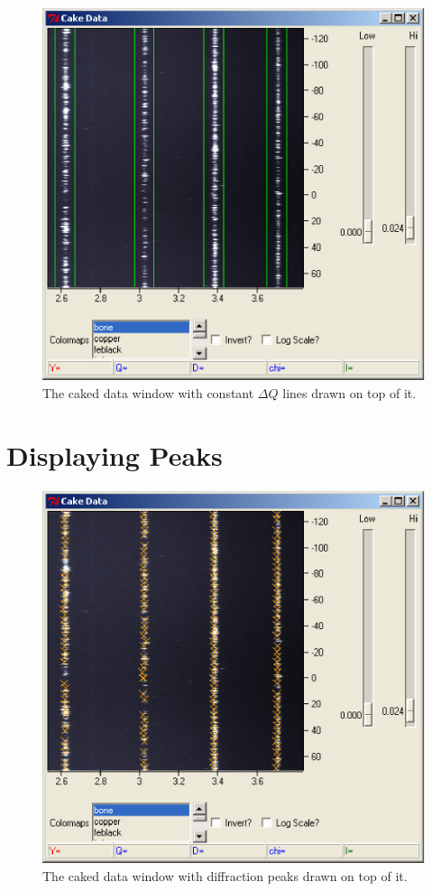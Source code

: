 \begin{figure}
    \centering
    \includegraphics[scale=.75]{figures/constant_dq_lines_on_cake_image.eps}
    \caption{The caked data window with constant 
    $\Delta Q$ lines drawn on top of it.}
    \label{constant_dq_lines_on_cake_image}
\end{figure}


\section{Displaying Peaks}\label{displaying_peaks_cake}

\begin{figure}
    \centering
    \includegraphics[scale=.75]{figures/peaks_on_cake_image.eps}
    \caption{The caked data window with diffraction 
    peaks drawn on top of it.}
    \label{peaks_on_cake_image}
\end{figure}

